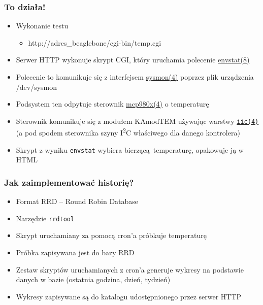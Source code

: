 \documentclass[dvipsnames,table]{beamer}
\begin{document}
\begin{frame}
\frametitle{To działa!}
\begin{itemize}
	\item Wykonanie testu
	\begin{itemize}
		\item http://adres\_beaglebone/cgi-bin/temp.cgi
	\end{itemize}
	\item Serwer HTTP wykonuje skrypt CGI, który uruchamia polecenie \href{http://netbsd.gw.com/cgi-bin/man-cgi?envstat++NetBSD-current}{envstat(8)}
	\item Polecenie to komunikuje się z interfejsem \href{http://netbsd.gw.com/cgi-bin/man-cgi?sysmon++NetBSD-current}{sysmon(4)} poprzez plik urządzenia /dev/sysmon
	\item Podsystem ten odpytuje sterownik \href{http://netbsd.gw.com/cgi-bin/man-cgi?mcp980x++NetBSD-current}{mcp980x(4)} o temperaturę
	\item Sterownik komunikuje się z modułem KAmodTEM używając warstwy {\tt \href{http://netbsd.gw.com/cgi-bin/man-cgi?iic++NetBSD-current}{iic(4)}} (a pod spodem sterownika szyny I\textsuperscript{2}C właściwego dla danego kontrolera)
	\item Skrypt z wyniku {\tt envstat} wybiera bierzącą temperaturę, opakowuje ją w HTML
\end{itemize}
\end{frame}

\begin{frame}
\frametitle{Jak zaimplementować historię?}
\begin{itemize}
	\item Format RRD -- Round Robin Database
	\item Narzędzie {\tt rrdtool}
	\item Skrypt uruchamiany za pomocą cron'a próbkuje temperaturę
	\item Próbka zapisywana jest do bazy RRD
	\item Zestaw skryptów uruchamianych z cron'a generuje wykresy na podstawie danych w bazie (ostatnia godzina, dzień, tydzień)
	\item Wykresy zapisywane są do katalogu udostępnionego przez serwer HTTP
\end{itemize}
\end{frame}

\end{document}
